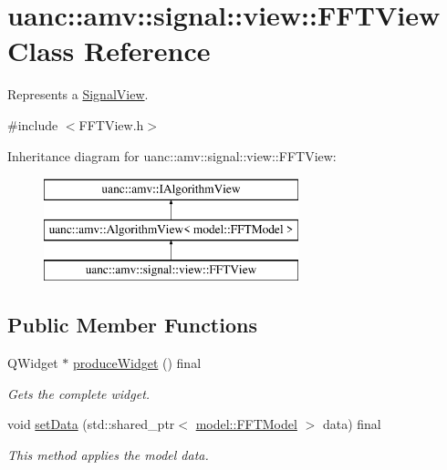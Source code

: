\hypertarget{classuanc_1_1amv_1_1signal_1_1view_1_1_f_f_t_view}{}\section{uanc\+:\+:amv\+:\+:signal\+:\+:view\+:\+:F\+F\+T\+View Class Reference}
\label{classuanc_1_1amv_1_1signal_1_1view_1_1_f_f_t_view}


Represents a \hyperlink{classuanc_1_1amv_1_1signal_1_1view_1_1_signal_view}{Signal\+View}.  




{\ttfamily \#include $<$F\+F\+T\+View.\+h$>$}

Inheritance diagram for uanc\+:\+:amv\+:\+:signal\+:\+:view\+:\+:F\+F\+T\+View\+:\begin{figure}[H]
\begin{center}
\leavevmode
\includegraphics[height=3.000000cm]{classuanc_1_1amv_1_1signal_1_1view_1_1_f_f_t_view}
\end{center}
\end{figure}
\subsection*{Public Member Functions}
\begin{DoxyCompactItemize}
\item 
Q\+Widget $\ast$ \hyperlink{classuanc_1_1amv_1_1signal_1_1view_1_1_f_f_t_view_a774599a51059f878472cf72e2ce4b2b2}{produce\+Widget} () final
\begin{DoxyCompactList}\small\item\em Gets the complete widget. \end{DoxyCompactList}\item 
void \hyperlink{classuanc_1_1amv_1_1signal_1_1view_1_1_f_f_t_view_ae88ee6486f60d2d0a89c05f4d45546f7}{set\+Data} (std\+::shared\+\_\+ptr$<$ \hyperlink{classuanc_1_1amv_1_1signal_1_1model_1_1_f_f_t_model}{model\+::\+F\+F\+T\+Model} $>$ data) final
\begin{DoxyCompactList}\small\item\em This method applies the model data. \end{DoxyCompactList}\end{DoxyCompactItemize}


